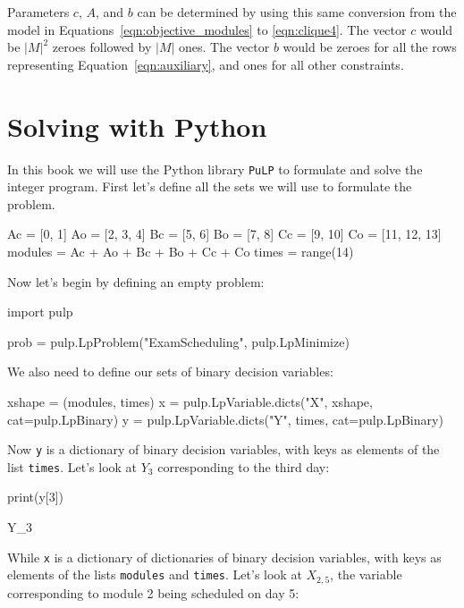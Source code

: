 Parameters $c$, $A$, and $b$ can be determined by using this same conversion
from the model in Equations~\ref{eqn:objective_modules} to \ref{eqn:clique4}.
The vector $c$ would be $|M|^2$ zeroes followed by $|M|$ ones.
The vector $b$ would be zeroes for all the rows representing
Equation~\ref{eqn:auxiliary}, and ones for all other constraints.


\section{Solving with Python}\label{sec:solving-with-python}
In this book we will use the Python library \texttt{PuLP} to
formulate and solve the integer program. First let's define all the sets we
will use to formulate the problem.

\begin{pyin}
Ac = [0, 1]
Ao = [2, 3, 4]
Bc = [5, 6]
Bo = [7, 8]
Cc = [9, 10]
Co = [11, 12, 13]
modules = Ac + Ao + Bc + Bo + Cc + Co
times = range(14)
\end{pyin}

Now let's begin by defining an empty problem:

\begin{pyin}
import pulp

prob = pulp.LpProblem("ExamScheduling", pulp.LpMinimize)
\end{pyin}

We also need to define our sets of binary decision variables:

\begin{pyin}
xshape = (modules, times)
x = pulp.LpVariable.dicts("X", xshape, cat=pulp.LpBinary)
y = pulp.LpVariable.dicts("Y", times, cat=pulp.LpBinary)
\end{pyin}

Now \texttt{y} is a dictionary of binary decision variables, with
keys as elements of the list \texttt{times}. Let's look at
$Y_3$ corresponding to the third day:

\begin{pyin}
print(y[3])
\end{pyin}

\begin{pyout}
Y_3
\end{pyout}

While \texttt{x} is a dictionary of dictionaries of binary decision
variables, with keys as elements of the lists \texttt{modules} and
\texttt{times}. Let's look at $X_{2,5}$, the variable corresponding
to module 2 being scheduled on day 5:


